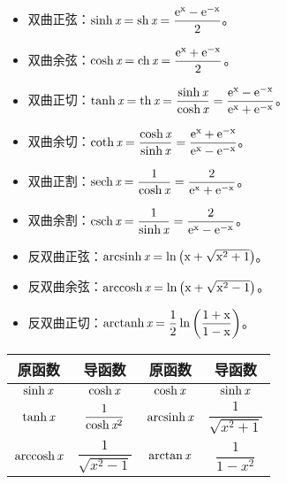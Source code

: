 \documentclass[UTF8, 12pt]{ctexart}
\begin{document}
\begin{itemize}
    \item 双曲正弦：$\rm{sinh}\,\textit{x}=\rm{sh}\,\textit{x}=\dfrac{e^x-e^{-x}}{2}$。
    \item 双曲余弦：$\rm{cosh}\,\textit{x}=\rm{ch}\,\textit{x}=\dfrac{e^x+e^{-x}}{2}$。
    \item 双曲正切：$\rm{tanh}\,\textit{x}=\rm{th}\,\textit{x}=\dfrac{\rm{sinh}\,\textit{x}}{\rm{cosh}\,\textit{x}}=\dfrac{e^x-e^{-x}}{e^x+e^{-x}}$。
    \item 双曲余切：$\rm{coth}\,\textit{x}=\dfrac{\rm{cosh}\,\textit{x}}{\rm{sinh}\,\textit{x}}=\dfrac{e^x+e^{-x}}{e^x-e^{-x}}$。
    \item 双曲正割：$\rm{sech}\,\textit{x}=\dfrac{1}{\rm{cosh}\,\textit{x}}=\dfrac{2}{e^x+e^{-x}}$。
    \item 双曲余割：$\rm{csch}\,\textit{x}=\dfrac{1}{\rm{sinh}\,\textit{x}}=\dfrac{2}{e^x-e^{-x}}$。
    \item 反双曲正弦：$\rm{arcsinh}\,\textit{x}=\ln\left(x+\sqrt{x^2+1}\right)$。
    \item 反双曲余弦：$\rm{arccosh}\,\textit{x}=\ln\left(x+\sqrt{x^2-1}\right)$。
    \item 反双曲正切：$\rm{arctanh}\,\textit{x}=\dfrac{1}{2}\ln\left(\dfrac{1+x}{1-x}\right)$。
\end{itemize}

\begin{center}
    \begin{tabular}{|c|c|c|c|}
        \hline
        原函数 & 导函数 & 原函数 & 导函数\\ \hline
        $\rm{sinh}\,\textit{x}$ & $\rm{cosh}\,\textit{x}$ & $\rm{cosh}\,\textit{x}$ & $\rm{sinh}\,\textit{x}$ \\ \hline
        $\rm{tanh}\,\textit{x}$ & $\dfrac{1}{\rm{cosh}\,\textit{x}^2}$ & $\rm{arcsinh}\,\textit{x}$ & $\dfrac{1}{\sqrt{x^2+1}}$ \\ \hline
        $\rm{arccosh}\,\textit{x}$ & $\dfrac{1}{\sqrt{x^2-1}}$ & $\rm{arctan}\,\textit{x}$ & $\dfrac{1}{1-x^2}$ \\
        \hline
    \end{tabular}
\end{center}
\end{document}
